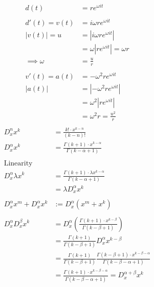 \documentclass{article}
\theoremstyle{plain}
\theoremstyle{definition}
\begin{document}
\newpage
\begin{align*}
	d(t)&=re^{\omega i t} \\
	\\
	d'(t)=v(t)&=i\omega  r e^{\omega i t} \\
	\left|v(t)\right|=u&=\left|i\omega  r e^{\omega i t}\right| \\
	&=\omega \left|r e^{\omega i t}\right|= \omega r \\
	\implies \omega &= \frac{u}{r} \\
	\\
	v'(t)=a(t)&=-\omega^2  r e^{\omega i t} \\
	\left|a(t)\right| &= \left|-\omega^2  r e^{\omega i t}\right| \\
	&= \omega^2 \left|r e^{\omega i t}\right| \\
	&= \omega^2r = \frac{u^2}{r} \\
\end{align*}
\newpage
\begin{align*}
	D_x^n x^k &= \frac{k!\cdot x^{k-n}}{(k-n)!} \\
	D_x^\alpha x^k &= \frac{\Gamma(k+1)\cdot x^{k-\alpha}}
	{\Gamma(k-\alpha+1)} \\
	\\
	\text{Linearity}\\
	D_x^\alpha \lambda x^k &= \frac{\Gamma(k+1)\cdot \lambda x^{k-\alpha}}
	{\Gamma(k-\alpha+1)} \\
	&=\lambda D_x^\alpha x^k \\
	\\
	D_x^\alpha x^m+ D_x^\alpha x^k &:= D_x^\alpha (x^m+x^k)\\
	\\
	D_x^\alpha D_x^\beta x^k &= D_x^\alpha\left(
	\frac{\Gamma(k+1)\cdot x^{k-\beta}}{\Gamma(k-\beta+1)}\right) \\
	&=\frac{\Gamma(k+1)}{\Gamma(k-\beta+1)}
	D_x^\alpha x^{k-\beta}\\
	&=\frac{\Gamma(k+1)}{\Gamma(k-\beta+1)}
	\frac{\Gamma(k-\beta+1)\cdot x^{k-\beta-\alpha}}
	{\Gamma(k-\beta-\alpha+1)}\\
	&=\frac{\Gamma(k+1)\cdot x^{k-\beta-\alpha}}
	{\Gamma(k-\beta-\alpha+1)} = D_x^{\alpha + \beta}x^k
\end{align*}
\end{document}
